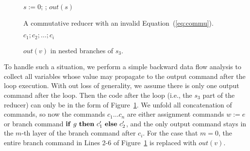 \documentclass{llncs}
\newcommand{\cur}{cur()}
\newcommand{\ite}[3]{
	 \ifmmode 
	 \mathbf{if}\ #1 \ \mathbf{then}\ #2\  \mathbf{else}\ #3 
	 \else
	 \textbf{if}\ #1 \ \textbf{then}\ #2\  \textbf{else}\ #3
	 \fi}
\begin{document}
\begin{figure}[hbt]
	\begin{minipage}{0.4\textwidth}
		\begin{algorithm}[H]
			$s:= 0$; \;
			\Loop{}{
				$t:=\cur$;
				$s:= s + t$\;
			};
			$out(s)$\;\;
		\end{algorithm}
		\caption{A commutative reducer with an invalid Equation~(\ref{eq:commu}).}
		\label{fig:reducer_opt}
	\end{minipage}
	\begin{minipage}{0.55\textwidth}
		\LinesNumbered
		\centering
		\begin{minipage}{0.75\textwidth}
		\begin{algorithm}[H]
			$c_1;c_2;\ldots;c_i$\;
			\lElse{ $\ldots$}
		\end{algorithm}
	\end{minipage}
		\caption{$out(v)$ in nested branches of $s_3$.}
		\label{fig:nested_out}
	\end{minipage}
\end{figure}


To handle such a situation, we perform a simple backward data flow analysis to collect all variables whose value may propagate to the output command after the loop execution. With out loss of generality, we assume there is only one output command after the loop. Then the code after the loop (i.e., the $s_3$ part of the reducer) can only be in the form of Figure~\ref{fig:nested_out}.
We unfold all concatenation of commands, so now the commands $c_1\ldots c_n$ are either assignment commands $w:=e$ or branch command $\ite{g}{c'_1}{c'_2}$, and the only output command stays in the $m$-th layer of the branch command after $c_i$. For the case that $m=0$, the entire branch command in Lines 2-6 of Figure~\ref{fig:nested_out} is replaced with $out(v)$.
\end{document}
